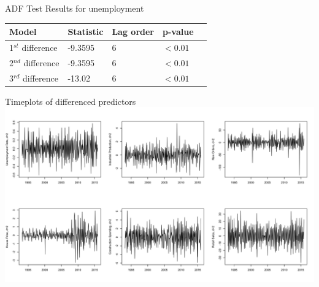 \documentclass[ignorenonframetext]{beamer}
\begin{document}
  	\begin{frame}{ADF Test Results for unemployment}
		 \begin{table}[htb]
		 \centering
		 \begin{tabular}{lllll}
		 \hline
		 \textbf{Model} & \textbf{Statistic} & \textbf{Lag order} & \textbf{p-value}\\ \hline
		  1\(^{st}\) difference &  -9.3595 & 6 &\( < 0.01\)\\
		  2\(^{nd}\) difference &  -9.3595 & 6 & \( < 0.01\)\\			  
		  3\(^{rd}\) difference &  -13.02 & 6 & \( < 0.01\)\\		 \hline
		 \end{tabular}
		 \end{table}
  	\end{frame}
 
  	\begin{frame}{Timeplots of differenced predictors}
		\includegraphics[width=\linewidth]{images/StationaryPred}
  	\end{frame}
 
\end{document}

